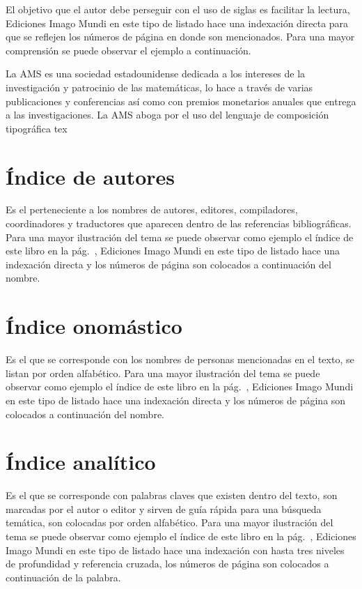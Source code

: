 \documentclass{book}
\begin{document}
{{{{{{{{{{{{{{{{{El objetivo que el autor debe perseguir con el uso de siglas es facilitar la lectura, Ediciones Imago Mundi en este tipo de listado hace una indexación directa para que se reflejen los números de página en donde son mencionados. Para una mayor comprensión se puede observar el ejemplo a continuación.

\begin{mdframed}[linewidth=.5pt,linecolor=black!30,roundcorner=3pt,backgroundcolor=yellow!15]
La \gls{AMS} es una sociedad estadounidense dedicada a los intereses de la investigación y patrocinio de las matemáticas, lo hace a través de varias publicaciones y conferencias así como con premios monetarios anuales que entrega a las investigaciones. La \gls{AMS} aboga por el uso del lenguaje de composición tipográfica \gls{tex}
\end{mdframed}

\section{Índice de autores \label{ind-autores}}

Es el perteneciente a los nombres de autores, editores, compiladores, coordinadores y traductores que aparecen dentro de las referencias bibliográficas. Para una mayor ilustración del tema se puede observar como ejemplo el índice de este libro en la pág.~\pageref{comienzo-autores}, Ediciones Imago Mundi en este tipo de listado hace una indexación directa y los números de página son colocados a continuación del nombre.

\section{Índice onomástico \label{ind-onomastico}}

Es el que se corresponde con los nombres de personas mencionadas en el texto, se listan por orden alfabético. Para una mayor ilustración del tema se puede observar como ejemplo el índice de este libro en la pág.~\pageref{comienzo-apellidos}, Ediciones Imago Mundi en este tipo de listado hace una indexación directa y los números de página son colocados a continuación del nombre.

\section{Índice analítico \label{ind-analitico}}

Es el que se corresponde con palabras claves que existen dentro del texto, son marcadas por el autor o editor y sirven de guía rápida para una búsqueda temática, son colocadas por orden alfabético. Para una mayor ilustración del tema se puede observar como ejemplo el índice de este libro en la pág.~\pageref{comienzo-claves}, Ediciones Imago Mundi en este tipo de listado hace una indexación con hasta tres niveles de profundidad y referencia cruzada, los números de página son colocados a continuación de la palabra.

}}}}}}}}}}}}}}}}}
\end{document}
